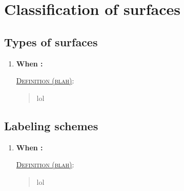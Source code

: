 \documentclass[letterpaper, 12pt]{book}
\newcommand{\defn}[2]{\textsc{\underline{Definition (#1)}:}\begin{quote} #2\end{quote}}
\begin{document}
\chapter{Classification of surfaces}
\section{Types of surfaces} %
    \begin{enumerate}[resume]
    \item \textbf{When :}

        \defn{blah}{lol}
    \end{enumerate}

\section{Labeling schemes}
    \begin{enumerate}[resume]
    \item \textbf{When :}

        \defn{blah}{lol}
    \end{enumerate}
\end{document}
